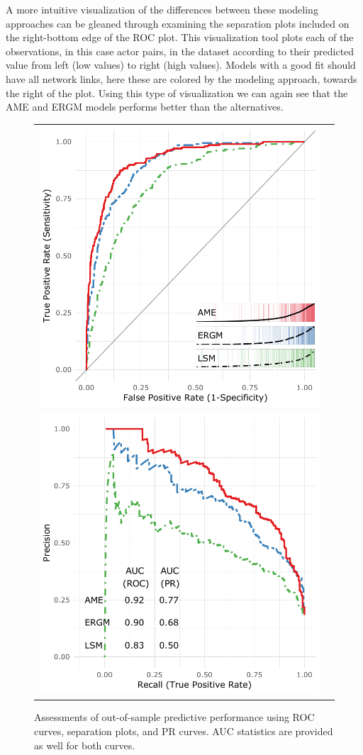 \documentclass[9pt,twocolumn,twoside,lineno]{pnas-new}
\begin{document}
A more intuitive visualization of the differences between these modeling approaches can be gleaned through examining the separation plots included on the right-bottom edge of the ROC plot. This visualization tool plots each of the observations, in this case actor pairs, in the dataset according to their predicted value from left (low values) to right (high values). Models with a good fit should have all network links, here these are colored by the modeling approach, towards the right of the plot. Using this type of visualization we can again see that the AME and ERGM models performs better than the alternatives.

\begin{figure}[ht]
	\centering
	\caption{Assessments of out-of-sample predictive performance using ROC curves, separation plots, and PR curves. AUC statistics are provided as well for both curves.}
	\begin{tabular}{cc}
	\includegraphics[width=.4\textwidth]{roc_outSampleSmall} \\
	\includegraphics[width=.4\textwidth]{rocPr_outSampleSmall}
	\end{tabular}
	\label{fig:roc}
\end{figure}
\FloatBarrier
\end{document}
